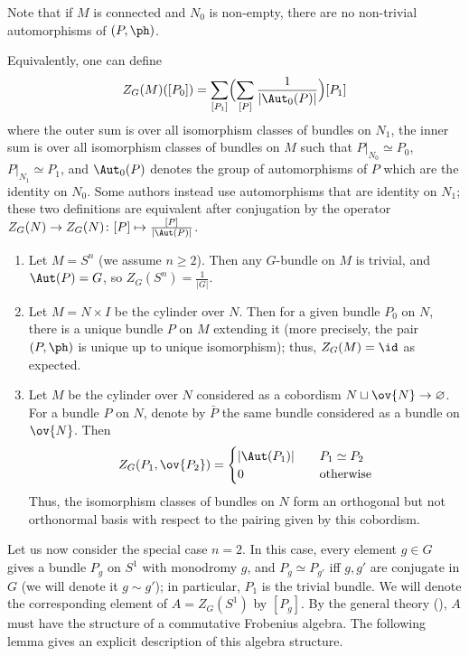 Note that if $M$ is connected and $N_0$ is non-empty, there are
no non-trivial automorphisms of $(P,\ph)$.

Equivalently, one can define %
$$
  Z_G(M)([P_0]) = \sum_{[P_1]} \Bigl(
                                    \sum_{[P]} \frac{1}{|\Aut_0(P)|}
                                \Bigr) [P_1]
$$
where the outer sum is over all isomorphism classes of bundles on $N_1$, the
inner sum is over all isomorphism classes of bundles on $M$ such that
$P|_{N_0}\simeq P_0$, $P|_{N_1}\simeq P_1$, and $\Aut_0(P)$ denotes the group of
automorphisms of $P$ which are the identity on $N_0$. Some authors instead use
automorphisms that are identity on $N_1$; these two definitions are equivalent
after conjugation by the operator
$Z_G(N)\to Z_G(N)\colon [P]\mapsto \frac{[P]}{|\Aut(P)|}$.

\begin{example}\label{x:dw-invariants}\par\noindent
  \begin{enumerate}
    \item Let $M=S^n$ (we assume $n\ge 2$). Then any $G$-bundle on $M$ is
      trivial, and $\Aut(P)=G$, so $Z_G(S^n)=\frac{1}{|G|}$.
    \item Let $M=N\times I$ be the cylinder over $N$.
      Then for a given bundle $P_0$ on $N$,
      there is a unique bundle $P$ on $M$ extending it (more precisely, the pair
      $(P, \ph)$ is unique up to unique isomorphism); thus, $Z_G(M)=\id$ as
      expected.
    \item Let $M$ be the cylinder over $N$ considered as a cobordism $N\sqcup
      \ov{N}\to \varnothing$. For a bundle $P$ on $N$,
      denote by $\bar P$ the same bundle considered as a bundle
      on $\ov{N}$. Then
      $$
      Z_G(P_1, \ov{P_2})=
      \begin{cases}
        |\Aut(P_1)| &\quad P_1\simeq P_2\\
        0 & \quad\text{otherwise}
      \end{cases}
      $$
      Thus, the isomorphism classes of bundles on $N$ form an orthogonal but not
      orthonormal basis with respect to the pairing given by this cobordism.
  \end{enumerate}
\end{example}

Let us now consider the special case $n=2$. In this case, every element $g\in G$
gives a bundle $P_g$ on $S^1$ with monodromy $g$, and $P_g\simeq P_{g'}$ iff $g,
g'$ are conjugate in $G$ (we will denote it $g\sim g'$); in particular, $P_1$ is
the trivial bundle. We will denote the corresponding element of $A=Z_G(S^1)$ by
$[P_g]$. By the general theory (), $A$ must have the
structure of a commutative Frobenius algebra. The following lemma gives an
explicit description of this algebra structure.

